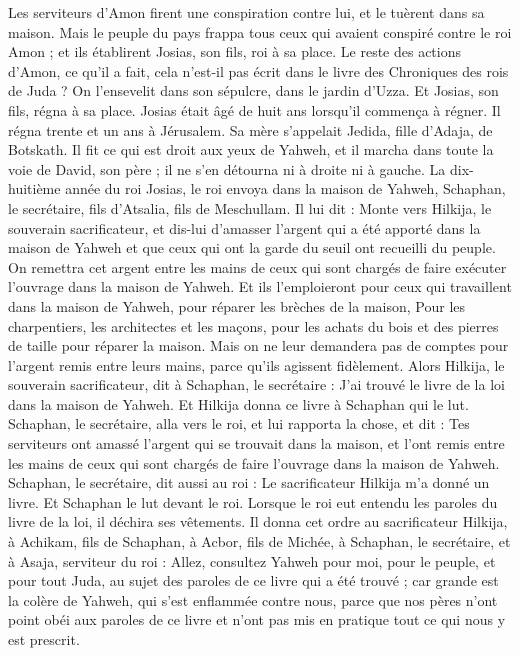 \begin{multicols}{2}
Les serviteurs d’Amon firent une conspiration contre lui, et le tuèrent dans sa maison.
Mais le peuple du pays frappa tous ceux qui avaient conspiré contre le roi Amon ; et ils établirent Josias, son fils, roi à sa place.
Le reste des actions d’Amon, ce qu’il a fait, cela n’est-il pas écrit dans le livre des Chroniques des rois de Juda ?
On l’ensevelit dans son sépulcre, dans le jardin d’Uzza. Et Josias, son fils, régna à sa place.
\VerseOne{}Josias était âgé de huit ans lorsqu’il commença à régner. Il régna trente et un ans à Jérusalem. Sa mère s’appelait Jedida, fille d’Adaja, de Botskath.
Il fit ce qui est droit aux yeux de Yahweh, et il marcha dans toute la voie de David, son père ; il ne s’en détourna ni à droite ni à gauche.
La dix-huitième année du roi Josias, le roi envoya dans la maison de Yahweh, Schaphan, le secrétaire, fils d’Atsalia, fils de Meschullam.
Il lui dit : Monte vers Hilkija, le souverain sacrificateur, et dis-lui d’amasser l’argent qui a été apporté dans la maison de Yahweh et que ceux qui ont la garde du seuil ont recueilli du peuple.
On remettra cet argent entre les mains de ceux qui sont chargés de faire exécuter l’ouvrage dans la maison de Yahweh. Et ils l’emploieront pour ceux qui travaillent dans la maison de Yahweh, pour réparer les brèches de la maison,
Pour les charpentiers, les architectes et les maçons, pour les achats du bois et des pierres de taille pour réparer la maison.
Mais on ne leur demandera pas de comptes pour l’argent remis entre leurs mains, parce qu’ils agissent fidèlement.
Alors Hilkija, le souverain sacrificateur, dit à Schaphan, le secrétaire : J’ai trouvé le livre de la loi dans la maison de Yahweh. Et Hilkija donna ce livre à Schaphan qui le lut.
Schaphan, le secrétaire, alla vers le roi, et lui rapporta la chose, et dit : Tes serviteurs ont amassé l’argent qui se trouvait dans la maison, et l’ont remis entre les mains de ceux qui sont chargés de faire l’ouvrage dans la maison de Yahweh.
Schaphan, le secrétaire, dit aussi au roi : Le sacrificateur Hilkija m’a donné un livre. Et Schaphan le lut devant le roi.
Lorsque le roi eut entendu les paroles du livre de la loi, il déchira ses vêtements.
Il donna cet ordre au sacrificateur Hilkija, à Achikam, fils de Schaphan, à Acbor, fils de Michée, à Schaphan, le secrétaire, et à Asaja, serviteur du roi :
Allez, consultez Yahweh pour moi, pour le peuple, et pour tout Juda, au sujet des paroles de ce livre qui a été trouvé ; car grande est la colère de Yahweh, qui s’est enflammée contre nous, parce que nos pères n’ont point obéi aux paroles de ce livre et n’ont pas mis en pratique tout ce qui nous y est prescrit.

\end{multicols}

